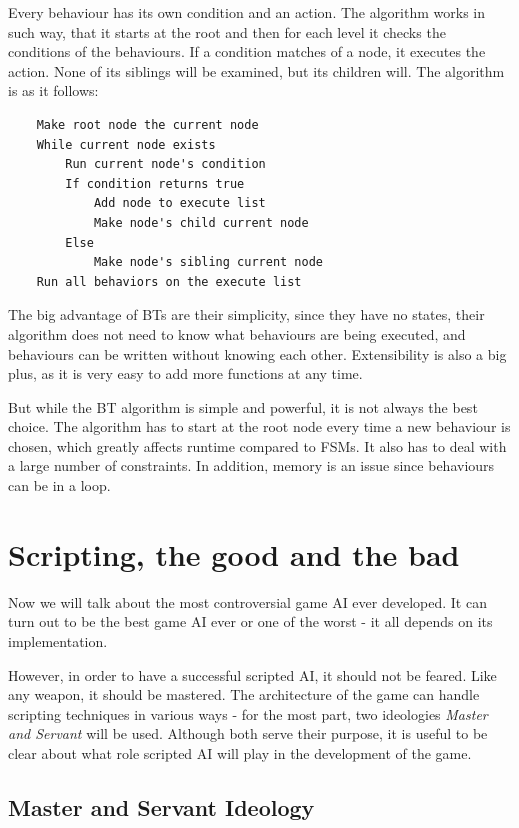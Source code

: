 \documentclass[a4paper,12pt,openright]{book}
\begin{document}
Every behaviour has its own condition and an action. The algorithm works in such way, that it starts at the root and then for each level it checks the conditions of the behaviours. If a condition matches of a node, it executes the action. None of its siblings will be examined, but its children will. The algorithm \cite{BehaviourSelectionAlgorithms} is as it follows:
\clearpage
\begin{verbatim}
    Make root node the current node
    While current node exists
        Run current node's condition
        If condition returns true
            Add node to execute list
            Make node's child current node
        Else
            Make node's sibling current node
    Run all behaviors on the execute list
\end{verbatim}

The big advantage of BTs \cite{BehaviourSelectionAlgorithms} are their simplicity, since they have no states, their algorithm does not need to know what behaviours are being executed, and behaviours can be written without knowing each other. Extensibility is also a big plus, as it is very easy to add more functions at any time.

But while the BT algorithm is simple and powerful, it is not always the best choice. The algorithm has to start at the root node every time a new behaviour is chosen, which greatly affects runtime compared to FSMs. It also has to deal with a large number of constraints. In addition, memory is an issue since behaviours can be in a loop.

\section{Scripting, the good and the bad}

Now we will talk about the most controversial game AI ever developed. It can turn out to be the best game AI ever or one of the worst - it all depends on its implementation.

However, in order to have a successful scripted AI, it should not be feared. Like any weapon, it should be mastered. 
The architecture of the game can handle scripting techniques in various ways - for the most part, two ideologies \emph{Master and Servant} \cite{ForbiddenScripting} will be used. Although both serve their purpose, it is useful to be clear about what role scripted AI will play in the development of the game.

\subsection{Master and Servant Ideology}
\end{document}
